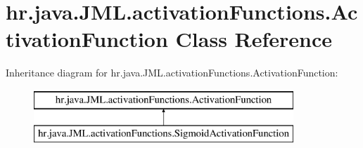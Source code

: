 \hypertarget{classhr_1_1java_1_1_j_m_l_1_1activation_functions_1_1_activation_function}{\section{hr.\+java.\+J\+M\+L.\+activation\+Functions.\+Activation\+Function Class Reference}
\label{classhr_1_1java_1_1_j_m_l_1_1activation_functions_1_1_activation_function}
}
Inheritance diagram for hr.\+java.\+J\+M\+L.\+activation\+Functions.\+Activation\+Function\+:\begin{figure}[H]
\begin{center}
\leavevmode
\includegraphics[height=2.000000cm]{classhr_1_1java_1_1_j_m_l_1_1activation_functions_1_1_activation_function}
\end{center}
\end{figure}
